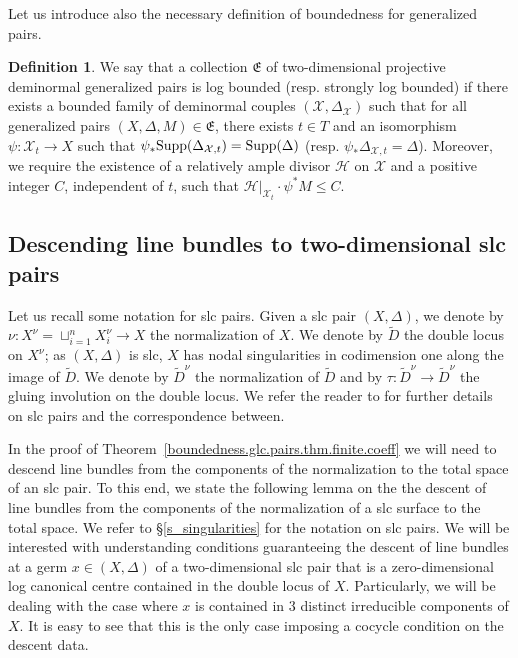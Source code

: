\documentclass[12pt, a4paper]{amsart}
\newcounter{Theorem}
\theoremstyle{definition}
\newtheorem{definition}[theorem]{Definition}
\theoremstyle{named}
\begin{document}
Let us introduce also the necessary definition of boundedness for generalized pairs.

\begin{definition}
\label{def.boundedness.gen.pair}
    We say that a collection 
    $\mathfrak E$
    of two-dimensional projective deminormal
    generalized pairs is log bounded (resp. strongly log bounded) if there exists a bounded family of deminormal couples
    $(\mathcal X, \Delta_{\mathcal X})$
    such that for all generalized pairs 
    $(X, \Delta, M) \in \mathfrak E$, 
    there exists 
    $t \in T$
    and an isomorphism
    $\psi \colon \mathcal X_t \to X$
    such that 
    $\psi_\ast {\rm Supp}(\Delta_{\mathcal X, t})={\rm Supp}(\Delta)$
    (resp.
    $\psi_\ast \Delta_{\mathcal X,t}=\Delta$). 
    Moreover, we require the existence of a relatively ample divisor $\mathcal H$ on $\mathcal X$ and a positive integer $C$, independent of $t$,  
    such that 
    $\mathcal H\vert_{\mathcal X_t} \cdot \psi^\ast M \leq C$.
\end{definition}

\iffalse
\subsection{Descending line bundles to two-dimensional slc pairs}


Let us recall some notation for slc pairs.
Given a slc pair 
$(X, \Delta)$, we denote by 
$\nu \colon X^\nu=\sqcup_{i=1}^{n} X_i^\nu \to X$ 
the normalization of 
$X$.
We denote by
$\tilde D$ 
the double locus on 
$X^\nu$; 
as $(X, \Delta)$ is slc, 
$X$ has nodal singularities in codimension one along the image of $\tilde D$.
We denote by 
$\tilde D^\nu$
the normalization of $\tilde D$ 
and by 
$\tau 
\colon 
\tilde D^\nu \to \tilde D^\nu$
the gluing involution on the double locus.
We refer the reader to \cite[\S 5]{Kollar13} for further details on slc pairs and the correspondence between.


In the proof of Theorem~\ref{boundedness.glc.pairs.thm.finite.coeff} we will need to descend line bundles from the components of the normalization to the total space of an slc pair.
To this end, we state the following lemma on the the descent of line bundles from the components of the normalization of a slc surface to the total space.
We refer to 
\S\ref{s_singularities} 
for the notation on slc pairs.
We will be interested with understanding conditions guaranteeing the descent of line bundles at a germ 
$x \in (X, \Delta)$
of a two-dimensional slc pair that is a zero-dimensional log canonical centre contained in the double locus of 
$X$.
Particularly, we will be dealing with the case where $x$ is contained in $3$ distinct irreducible components of $X$. It is easy to see that this is the only case imposing a cocycle condition on the descent data.
\end{document}
